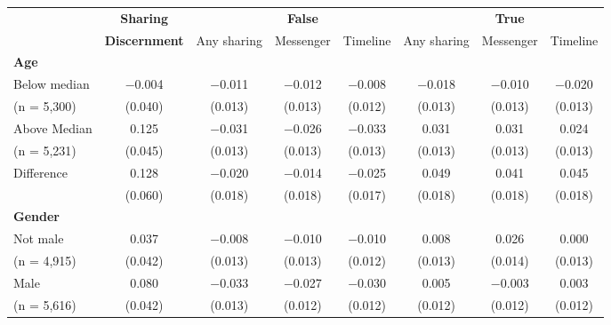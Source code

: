 
\begin{tabular}[t]{lccccccc}
 & \textbf{Sharing} &  & \textbf{False} &  &  & \textbf{True} & \\
 & \textbf{Discernment} & Any sharing & Messenger & Timeline & Any sharing & Messenger & Timeline\\\cmidrule(lr){2-2} \cmidrule(lr){3-5} \cmidrule(lr){6-8} \multicolumn{4}{l}{\textbf{Age}} \rule{0pt}{1.2\normalbaselineskip}\\
\hspace{1em} Below median & \num{-0.004} & \num{-0.011} & \num{-0.012} & \num{-0.008} & \num{-0.018} & \num{-0.010} & \num{-0.020}\\
\hspace{2em}(n = 5,300) & (\num{0.040}) & (\num{0.013}) & (\num{0.013}) & (\num{0.012}) & (\num{0.013}) & (\num{0.013}) & (\num{0.013})\\
\hspace{1em} Above Median & \num{0.125} & \num{-0.031} & \num{-0.026} & \num{-0.033} & \num{0.031} & \num{0.031} & \num{0.024}\\
\hspace{2em}(n = 5,231) & (\num{0.045}) & (\num{0.013}) & (\num{0.013}) & (\num{0.013}) & (\num{0.013}) & (\num{0.013}) & (\num{0.013})\\\cmidrule(lr){2-8}
\hspace{1em} Difference & \num{0.128} & \num{-0.020} & \num{-0.014} & \num{-0.025} & \num{0.049} & \num{0.041} & \num{0.045}\\
\hspace{2em} & (\num{0.060}) & (\num{0.018}) & (\num{0.018}) & (\num{0.017}) & (\num{0.018}) & (\num{0.018}) & (\num{0.018})\\\multicolumn{4}{l}{\textbf{Gender}} \rule{0pt}{1.2\normalbaselineskip}\\
\hspace{1em} Not male & \num{0.037} & \num{-0.008} & \num{-0.010} & \num{-0.010} & \num{0.008} & \num{0.026} & \num{0.000}\\
\hspace{2em}(n = 4,915) & (\num{0.042}) & (\num{0.013}) & (\num{0.013}) & (\num{0.012}) & (\num{0.013}) & (\num{0.014}) & (\num{0.013})\\
\hspace{1em} Male & \num{0.080} & \num{-0.033} & \num{-0.027} & \num{-0.030} & \num{0.005} & \num{-0.003} & \num{0.003}\\
\hspace{2em}(n = 5,616) & (\num{0.042}) & (\num{0.013}) & (\num{0.012}) & (\num{0.012}) & (\num{0.012}) & (\num{0.012}) & (\num{0.012})\\\cmidrule(lr){2-8}

\end{tabular}
